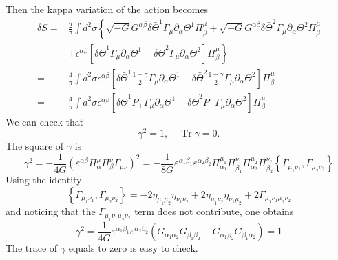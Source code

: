 \documentclass[graybox,envcountchap,sectrefs]{svmono}
\begin{document}
Then the kappa variation of the action becomes
\begin{align}
\delta S=& \frac{2}{\pi} \int d^{2} \sigma\left\{\sqrt{-G} G^{\alpha \beta} \delta \bar{\Theta}^{1} \Gamma_{\mu} \partial_{\alpha} \Theta^{1} \Pi_{\beta}^{\mu}+\sqrt{-G} G^{\alpha \beta} \delta \bar{\Theta}^{2} \Gamma_{\mu} \partial_{\alpha} \Theta^{2} \Pi_{\beta}^{\mu}\right.\\
&\left.+\epsilon^{\alpha \beta}\left[\delta \bar{\Theta}^{1} \Gamma_{\mu} \partial_{\alpha} \Theta^{1}-\delta \bar{\Theta}^{2} \Gamma_{\mu} \partial_{\alpha} \Theta^{2}\right] \Pi_{\beta}^{\mu}\right\} \\
=& \frac{4}{\pi} \int d^{2} \sigma \epsilon^{\alpha \beta}\left[\delta \bar{\Theta}^{1} \frac{1+\gamma}{2} \Gamma_{\mu} \partial_{\alpha} \Theta^{1}-\delta \bar{\Theta}^{2} \frac{1-\gamma}{2} \Gamma_{\mu} \partial_{\alpha} \Theta^{2}\right] \Pi_{\beta}^{\mu}\\
=&\frac{4}{\pi} \int d^{2} \sigma \epsilon^{\alpha \beta}\left[\delta \bar{\Theta}^{1} P_{+} \Gamma_{\mu} \partial_{\alpha} \Theta^{1}-\delta \bar{\Theta}^{2} P_{-} \Gamma_{\mu} \partial_{\alpha} \Theta^{2}\right] \Pi_{\beta}^{\mu}
\end{align}
We can check that
\begin{equation}
\gamma^{2}=1, \quad \operatorname{Tr} \gamma=0.
\end{equation}
The square of $\gamma$ is
\begin{equation}
\gamma^{2}=-\frac{1}{4 G}\left(\varepsilon^{\alpha \beta} \Pi_{\alpha}^{\mu} \Pi_{\beta}^{\nu} \Gamma_{\mu \nu}\right)^{2}=-\frac{1}{8 G} \varepsilon^{\alpha_{1} \beta_{1}} \varepsilon^{\alpha_{2} \beta_{2}} \Pi_{\alpha_{1}}^{\mu_{1}} \Pi_{\beta_{1}}^{\nu_{1}} \Pi_{\alpha_{2}}^{\mu_{2}} \Pi_{\beta_{2}}^{\nu_{2}}\left\{\Gamma_{\mu_{1} \nu_{1}}, \Gamma_{\mu_{2} \nu_{2}}\right\}
\end{equation}
Using the identity
\begin{equation}
\left\{\Gamma_{\mu_{1} \nu_{1}}, \Gamma_{\mu_{2} \nu_{2}}\right\}=-2 \eta_{\mu_{1} \mu_{2}} \eta_{\nu_{1} \nu_{2}}+2 \eta_{\mu_{1} \nu_{2}} \eta_{\nu_{1} \mu_{2}}+2 \Gamma_{\mu_{1} \nu_{1} \mu_{2} \nu_{2}}
\end{equation}
and noticing that the $\Gamma_{\mu_{1} \nu_{1} \mu_{2} \nu_{2}}$ term does not contribute, one obtains
\begin{equation}
\gamma^{2}=\frac{1}{4 G} \varepsilon^{\alpha_{1} \beta_{1}} \varepsilon^{\alpha_{2} \beta_{2}}\left(G_{\alpha_{1} \alpha_{2}} G_{\beta_{1} \beta_{2}}-G_{\alpha_{1} \beta_{2}} G_{\beta_{1} \alpha_{2}}\right)=1
\end{equation}
The trace of $\gamma$ equals to zero is easy to check.
\end{document}
